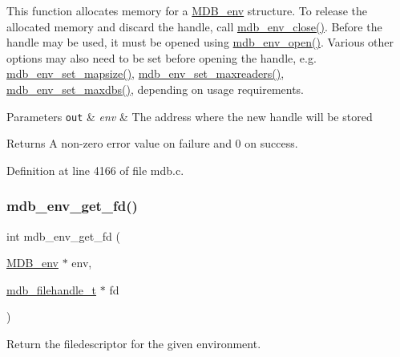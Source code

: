 This function allocates memory for a \mbox{\hyperlink{struct_m_d_b__env}{M\+D\+B\+\_\+env}} structure. To release the allocated memory and discard the handle, call \mbox{\hyperlink{group__mdb_ga4366c43ada8874588b6a62fbda2d1e95}{mdb\+\_\+env\+\_\+close()}}. Before the handle may be used, it must be opened using \mbox{\hyperlink{group__mdb_ga32a193c6bf4d7d5c5d579e71f22e9340}{mdb\+\_\+env\+\_\+open()}}. Various other options may also need to be set before opening the handle, e.\+g. \mbox{\hyperlink{group__mdb_ga4c47a5830f1071e578eaa1bbda2ae83e}{mdb\+\_\+env\+\_\+set\+\_\+mapsize()}}, \mbox{\hyperlink{group__mdb_gae687966c24b790630be2a41573fe40e2}{mdb\+\_\+env\+\_\+set\+\_\+maxreaders()}}, \mbox{\hyperlink{group__mdb_gaa2fc2f1f37cb1115e733b62cab2fcdbc}{mdb\+\_\+env\+\_\+set\+\_\+maxdbs()}}, depending on usage requirements. 
\begin{DoxyParams}[1]{Parameters}
\mbox{\tt out}  & {\em env} & The address where the new handle will be stored \\
\hline
\end{DoxyParams}
\begin{DoxyReturn}{Returns}
A non-\/zero error value on failure and 0 on success. 
\end{DoxyReturn}


Definition at line 4166 of file mdb.\+c.

\mbox{\label{group__mdb_gaf1570e7c0e5a5d860fef1032cec7d5f2}} 
\subsubsection{\texorpdfstring{mdb\+\_\+env\+\_\+get\+\_\+fd()}{mdb\_env\_get\_fd()}}
{\footnotesize\ttfamily int mdb\+\_\+env\+\_\+get\+\_\+fd (\begin{DoxyParamCaption}\item[{\mbox{\hyperlink{struct_m_d_b__env}{M\+D\+B\+\_\+env}} $\ast$}]{env,  }\item[{\mbox{\hyperlink{lmdb_8h_a6799f2853adc2e3b863dc2e6d9d0064f}{mdb\+\_\+filehandle\+\_\+t}} $\ast$}]{fd }\end{DoxyParamCaption})}



Return the filedescriptor for the given environment. 


